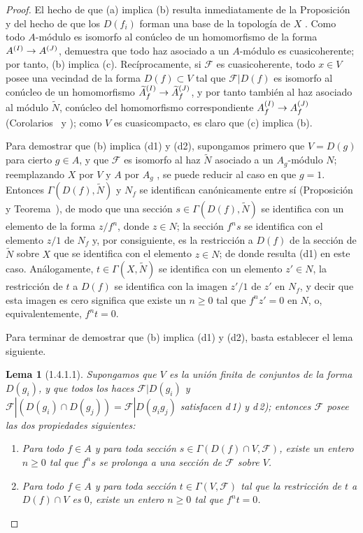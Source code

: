 \documentclass[oneside]{amsart}
\theoremstyle{ega-env-style}
\theoremstyle{ega-thm-env-style}
\newtheorem*{lemma}{Lema}
\theoremstyle{ega-defn-env-style}
\def\geq{\geqslant}                 %
\renewcommand{\to}{\mathchoice{\longrightarrow}{\rightarrow}{\rightarrow}{\rightarrow}}
\newcommand{\oldpage}[2][]{{\marginnote{\normalfont{\textbf{#1}~|~#2}}}\ignorespaces}
\let\EGAOriginalLabel\label
\renewcommand{\label}[1]{\phantomsection\EGAOriginalLabel{#1}}
\begin{document}
\begin{proof}
El hecho de que (a) implica (b) resulta inmediatamente de la Proposición~ y del hecho de que los $D(f_i)$ forman una base de la topología de $X$ .
Como todo $A$-módulo es isomorfo al conúcleo de un homomorfismo de la forma $A^{(I)}\to A^{(J)}$,  demuestra que todo haz asociado a un $A$-módulo es cuasicoherente;
por tanto, (b) implica (c).
Recíprocamente, si $\mathscr{F}$ es cuasicoherente, todo $x\in V$ posee una vecindad de la forma $D(f)\subset V$ tal que $\mathscr{F}|D(f)$ es isomorfo al conúcleo de un homomorfismo $\widetilde{A}_f^{(I)}\to\widetilde{A}_f^{(J)}$, y por tanto también al haz asociado al módulo $\widetilde{N}$, conúcleo del homomorfismo correspondiente
$A_f^{(I)}\to A_f^{(J)}$ (Corolarios~ y );
como $V$ es cuasicompacto, es claro que (c) implica (b).

\oldpage[I]{91}
Para demostrar que (b) implica (d1) y (d2), supongamos primero que $V=D(g)$ para cierto $g\in A$, y que $\mathscr{F}$ es isomorfo al haz $\widetilde{N}$ asociado a un $A_g$-módulo $N$;
reemplazando $X$ por $V$ y $A$ por $A_g$ , se puede reducir al caso en que $g=1$.
Entonces $\Gamma(D(f),\widetilde{N})$ y $N_f$ se identifican canónicamente entre sí (Proposición~ y Teorema~), de modo que una sección $s\in\Gamma(D(f),\widetilde{N})$ se identifica con un elemento de la forma $z/f^n$, donde $z\in N$;
la sección $f^n s$ se identifica con el elemento $z/1$ de $N_f$ y, por consiguiente, es la restricción a $D(f)$ de la sección de $\widetilde{N}$ sobre $X$ que se identifica con el elemento $z\in N$;
de donde resulta (d1) en este caso.
Análogamente, $t\in\Gamma(X,\widetilde{N})$ se identifica con un elemento $z'\in N$, la restricción de $t$ a $D(f)$ se identifica con la imagen $z'/1$ de $z'$ en $N_f$, y decir que esta imagen es cero significa que existe un $n\geq0$ tal que $f^n z'=0$ en $N$, o, equivalentemente, $f^n t=0$.

Para terminar de demostrar que (b) implica (d1) y (d2), basta establecer el lema siguiente.
\begin{lemma}[1.4.1.1]
\label{I.1.4.1.1}
Supongamos que $V$ es la unión finita de conjuntos de la forma $D(g_i)$, y que todos los haces $\mathscr{F}|D(g_i)$ y $\mathscr{F}|(D(g_i)\cap D(g_j))=\mathscr{F}|D(g_i g_j)$ satisfacen \textup{d\,1)} y \textup{d\,2)};
entonces $\mathscr{F}$ posee las dos propiedades siguientes:
\begin{enumerate}
  \item[\textup{d'\,1)}] Para todo $f\in A$ y para toda sección $s\in\Gamma(D(f)\cap V,\mathscr{F})$, existe un entero $n\geq0$ tal que $f^n s$ se prolonga a una sección de $\mathscr{F}$ sobre $V$.
  \item[\textup{d'\,2)}] Para todo $f\in A$ y para toda sección $t\in\Gamma(V,\mathscr{F})$ tal que la restricción de $t$ a $D(f)\cap V$ es $0$, existe un entero $n\geq0$ tal que $f^n t=0$.
\end{enumerate}
\end{lemma}


\end{proof}
\end{document}
